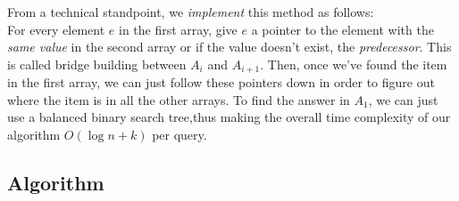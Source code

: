 \documentclass[11pt]{article}
\begin{document}
From a technical standpoint, we \textit{implement} this method as follows: \\
For every element $e$ in the first array, give $e$ a pointer to the element with the \textit{same value} in the second array or if the value doesn't exist, the \textit{predecessor}. This is called bridge building between $A_i$ and $A_{i+1}$. Then, once we've found the item in the first array, we can just follow these pointers down in order to figure out where the item is in all the other arrays. To find the answer in $A_1$, we can just use a balanced binary search tree,thus making the overall time complexity of our algorithm $O(\log n + k)$ per query.







\subsection{Algorithm}
\begin{tcolorbox}[blanker,width=(\linewidth-3.5cm)]
\begin{algorithm}[H]
    \SetAlgoLined
    
    
    {
    }
    
    

\end{algorithm}
\end{tcolorbox}
\end{document}
